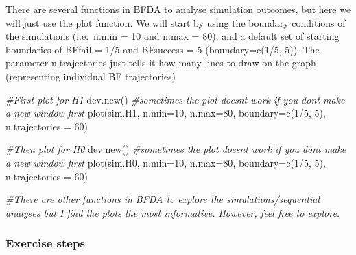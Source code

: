 \documentclass[
]{book}
\newenvironment{Shaded}{\begin{snugshade}}{\end{snugshade}}
\newcommand{\AttributeTok}[1]{\textcolor[rgb]{0.77,0.63,0.00}{#1}}
\newcommand{\CommentTok}[1]{\textcolor[rgb]{0.56,0.35,0.01}{\textit{#1}}}
\newcommand{\DecValTok}[1]{\textcolor[rgb]{0.00,0.00,0.81}{#1}}
\newcommand{\FunctionTok}[1]{\textcolor[rgb]{0.00,0.00,0.00}{#1}}
\newcommand{\NormalTok}[1]{#1}
\newcommand{\SpecialCharTok}[1]{\textcolor[rgb]{0.00,0.00,0.00}{#1}}
\begin{document}
There are several functions in BFDA to analyse simulation outcomes, but here we will just use the plot function. We will start by using the boundary conditions of the simulations (i.e.~n.min = 10 and n.max = 80), and a default set of starting boundaries of BFfail = 1/5 and BFsuccess = 5 (boundary=c(1/5, 5)). The parameter n.trajectories just tells it how many lines to draw on the graph (representing individual BF trajectories)

\begin{Shaded}
\begin{Highlighting}[]
\CommentTok{\#First plot for H1}
\FunctionTok{dev.new}\NormalTok{() }\CommentTok{\#sometimes the plot doesn\textquotesingle{}t work if you don\textquotesingle{}t make a new window first}
\FunctionTok{plot}\NormalTok{(sim.H1, }\AttributeTok{n.min=}\DecValTok{10}\NormalTok{, }\AttributeTok{n.max=}\DecValTok{80}\NormalTok{, }\AttributeTok{boundary=}\FunctionTok{c}\NormalTok{(}\DecValTok{1}\SpecialCharTok{/}\DecValTok{5}\NormalTok{, }\DecValTok{5}\NormalTok{), }\AttributeTok{n.trajectories =} \DecValTok{60}\NormalTok{)}

\CommentTok{\#Then plot for H0}
\FunctionTok{dev.new}\NormalTok{() }\CommentTok{\#sometimes the plot doesn\textquotesingle{}t work if you don\textquotesingle{}t make a new window first}
\FunctionTok{plot}\NormalTok{(sim.H0, }\AttributeTok{n.min=}\DecValTok{10}\NormalTok{, }\AttributeTok{n.max=}\DecValTok{80}\NormalTok{, }\AttributeTok{boundary=}\FunctionTok{c}\NormalTok{(}\DecValTok{1}\SpecialCharTok{/}\DecValTok{5}\NormalTok{, }\DecValTok{5}\NormalTok{), }\AttributeTok{n.trajectories =} \DecValTok{60}\NormalTok{)}

\CommentTok{\#There are other functions in BFDA to explore the simulations/sequential analyses but I find the plots the most informative. However, feel free to explore.}
\end{Highlighting}
\end{Shaded}

\hypertarget{exercise-steps}{%
\subsubsection{Exercise steps}\label{exercise-steps}}
\end{document}
